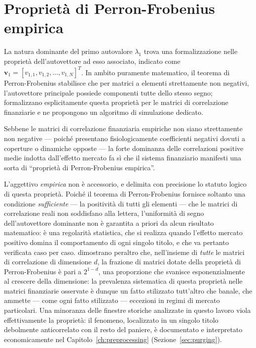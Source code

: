 \section{Proprietà di Perron-Frobenius empirica}
\label{sec:perron_frobenius}

La natura dominante del primo autovalore $\lambda_1$ trova una formalizzazione nelle proprietà dell'autovettore ad esso associato, indicato come $\mathbf{v}_1 = [v_{1,1}, v_{1,2}, \dots, v_{1,N}]^T$. In ambito puramente matematico, il teorema di Perron-Frobenius stabilisce che per matrici a elementi strettamente non negativi, l'autovettore principale possiede componenti tutte dello stesso segno; \citet{huttner2019simulating} formalizzano esplicitamente questa proprietà per le matrici di correlazione finanziarie e ne propongono un algoritmo di simulazione dedicato.

Sebbene le matrici di correlazione finanziaria empiriche non siano strettamente non negative --- poiché presentano fisiologicamente coefficienti negativi dovuti a coperture o dinamiche opposte --- la forte dominanza delle correlazioni positive medie indotta dall'effetto mercato fa sì che il sistema finanziario manifesti una sorta di ``proprietà di Perron-Frobenius empirica''.

L'aggettivo \emph{empirica} non è accessorio, e delimita con precisione lo statuto logico di questa proprietà. Poiché il teorema di Perron-Frobenius fornisce soltanto una condizione \emph{sufficiente} --- la positività di tutti gli elementi --- che le matrici di correlazione reali non soddisfano alla lettera, l'uniformità di segno dell'autovettore dominante non è garantita a priori da alcun risultato matematico: è una regolarità statistica, che si realizza quando l'effetto mercato positivo domina il comportamento di ogni singolo titolo, e che va pertanto verificata caso per caso. \citet{huttner2019simulating} dimostrano peraltro che, nell'insieme di \emph{tutte} le matrici di correlazione di dimensione $d$, la frazione di matrici dotate della proprietà di Perron-Frobenius è pari a $2^{1-d}$, una proporzione che svanisce esponenzialmente al crescere della dimensione: la prevalenza sistematica di questa proprietà nelle matrici finanziarie osservate è dunque un fatto stilizzato tutt'altro che banale, che ammette --- come ogni fatto stilizzato --- eccezioni in regimi di mercato particolari. Una minoranza delle finestre storiche analizzate in questo lavoro viola effettivamente la proprietà: il fenomeno, localizzato in un singolo titolo debolmente anticorrelato con il resto del paniere, è documentato e interpretato economicamente nel Capitolo~\ref{ch:preprocessing} (Sezione~\ref{sec:purging}).


